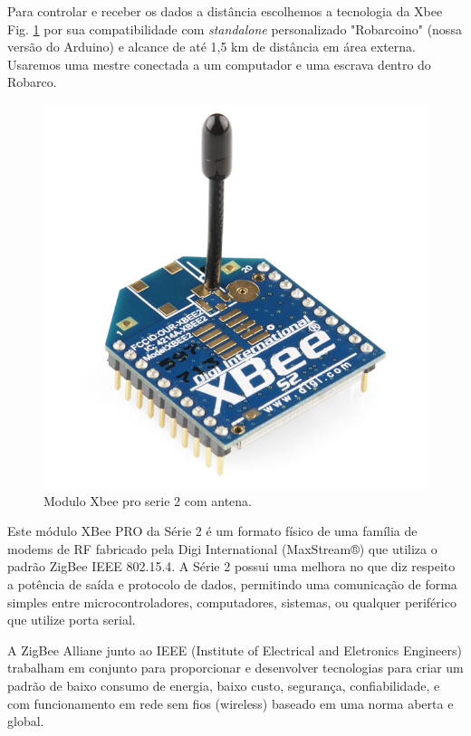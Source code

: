Para controlar e receber os dados a distância escolhemos a tecnologia da Xbee Fig. \ref{Xbee} por sua compatibilidade com \textit{standalone} personalizado "Robarcoino" (nossa versão do Arduino) e alcance de até 1,5 km de distância em área externa. Usaremos uma mestre conectada a um computador e uma escrava dentro do Robarco.
 \begin{figure} [!htp]
	\centering
	\includegraphics[scale=0.5]{figuras/Xbee}
	\caption{Modulo Xbee pro serie 2 com antena.}
	\label{Xbee}
\end{figure}
Este módulo XBee PRO da Série 2 é um formato físico de uma família de modems de RF fabricado pela Digi International (MaxStream®) que utiliza o padrão ZigBee IEEE 802.15.4. A Série 2 possui uma melhora no que diz respeito a potência de saída e protocolo de dados, permitindo uma comunicação de forma simples entre microcontroladores, computadores, sistemas, ou qualquer periférico que utilize porta serial.



A ZigBee Alliane junto ao IEEE (Institute of Electrical and Eletronics Engineers) trabalham em conjunto para proporcionar e desenvolver tecnologias para criar um padrão de baixo consumo de energia, baixo custo, segurança, confiabilidade, e com funcionamento em rede sem fios (wireless) baseado em uma norma aberta e global.



